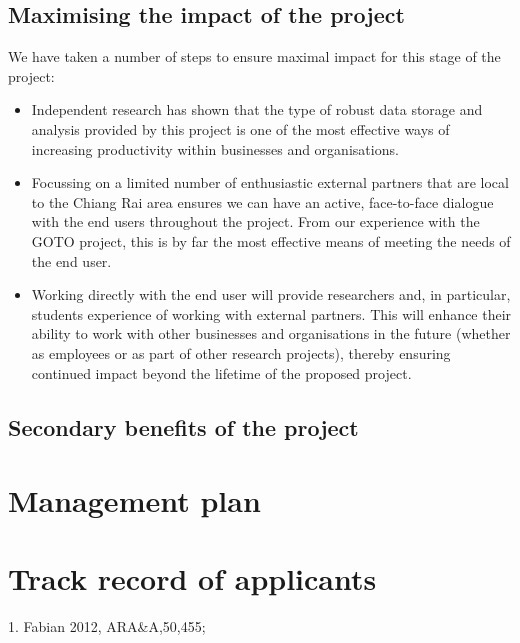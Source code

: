 \documentclass[11pt]{article}
\begin{document}
\subsection{Maximising the impact of the project}
We have taken a number of steps to ensure maximal impact for this stage of the project:
\begin{itemize}[leftmargin=6mm]
  \item Independent research has shown that the type of robust data storage and analysis provided by this project is one of the most effective ways of increasing productivity within businesses and organisations. 
  \item Focussing on a limited number of enthusiastic external partners that are local to the Chiang Rai area ensures we can have an active, face-to-face dialogue with the end users throughout the project. From our experience with the GOTO project, this is by far the most effective means of meeting the needs of the end user.
  \item Working directly with the end user will provide researchers and, in particular, students experience of working with external partners. This will enhance their ability to work with other businesses and organisations in the future (whether as employees or as part of other research projects), thereby ensuring continued impact beyond the lifetime of the proposed project. 
\end{itemize}

\subsection{Secondary benefits of the project}

\section{Management plan}

\section{Track record of applicants}


\vspace{10mm}
 {\scriptsize 1. Fabian 2012,
  ARA\&A,50,455;
}
\end{document}

